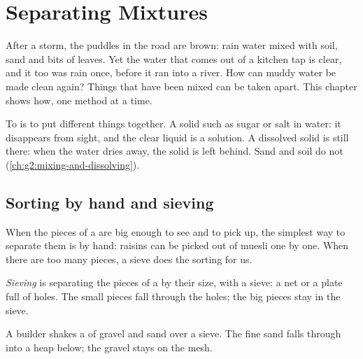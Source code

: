 \chapter{Separating Mixtures}\label{ch:g3:separating-mixtures}

After a storm, the puddles in the road are brown: rain water mixed with
soil, sand and bits of leaves. Yet the water that comes out of a kitchen
tap is clear, and it too was rain once, before it ran into a river. How
can muddy water be made clean again? Things that have been mixed can be
taken apart. This chapter shows how, one method at a time.

\begin{recall}
To  is to put different things together. A solid such as sugar or
salt  in water: it disappears from sight, and the clear liquid
is a solution. A dissolved solid is still there: when the water dries
away, the solid is left behind. Sand and soil do not 
(\cref{ch:g2:mixing-and-dissolving}).
\end{recall}

\section{Sorting by hand and sieving}

When the pieces of a  are big enough to see and to pick up, the
simplest way to separate them is by hand: raisins can be picked out of
muesli one by one. When there are too many pieces, a sieve does the
sorting for us.

\begin{definition}[Sieving]\label{def:g3:separating-mixtures:sieve}
\emph{Sieving} is separating the pieces of a  by
their size, with a sieve: a net or a plate full of holes. The small
pieces fall through the holes; the big pieces stay in the sieve.
\end{definition}

\begin{example}\label{ex:g3:separating-mixtures:gravel}
A builder shakes a  of gravel and sand over a sieve. The fine sand
falls through into a heap below; the gravel stays on the mesh.
\end{example}

